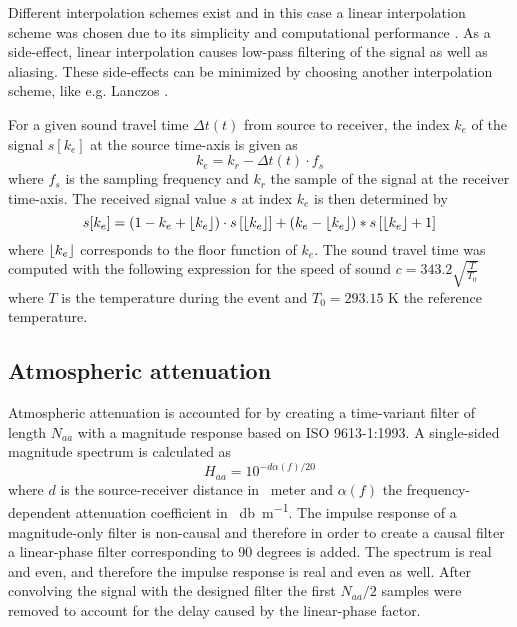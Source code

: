 \documentclass[10pt,twocolumn]{article}
\DeclarePairedDelimiter\floor{\lfloor}{\rfloor}
\begin{document}
Different interpolation schemes exist and in this case a linear interpolation
scheme was chosen due to its simplicity and computational performance \cite{Heutschi2014}.
As a side-effect, linear interpolation causes low-pass filtering of the signal as
well as aliasing. These side-effects can be minimized by choosing another
interpolation scheme, like e.g. Lanczos \cite{Rietdijk2015, Pieren2015}.


For a given sound travel time $\Delta t(t)$ from source to receiver, the index
$k_{e}$ of the signal $s[k_e]$ at the source time-axis is given as
\begin{equation}
 k_{e} = k_r - \Delta t (t) \cdot f_s
\end{equation}
where $f_s$ is the sampling frequency and $k_r$ the sample of the signal at the receiver time-axis. The received signal value $s$ at index $k_e$ is then determined by
\begin{equation}
 s[k_e] = \left( 1 - k_e +  \floor{k_e} \right) \cdot s \left[ \floor{k_e} \right] + \left( k_e - \floor{k_e} \right) * s \left[ \floor{k_e} + 1 \right]
\end{equation}
where $\floor{k_e}$ corresponds to the floor function of $k_e$.
The sound travel time was computed with the following expression for the speed of sound $c = 343.2 \sqrt{ \frac{T}{T_0} }$
where $T$ is the temperature during the event and $T_0 = 293.15$ K the reference temperature.


\subsection{Atmospheric attenuation}
Atmospheric attenuation is accounted for by creating a time-variant filter of length $N_{aa}$
with a magnitude response based on ISO 9613-1:1993\cite{ISO9613-1}. A single-sided magnitude spectrum is calculated as
\begin{equation}
 H_{aa} = 10^{- d \alpha(f) / 20}
\end{equation}
where $d$ is the source-receiver distance in \SI{}{meter} and $\alpha(f)$ the
frequency-dependent attenuation coefficient in \SI{}{\decibel\per\meter}.
The impulse response of a magnitude-only filter is non-causal and therefore in
order to create a causal filter a linear-phase filter corresponding to 90
degrees is added. The spectrum is real and even, and therefore the impulse
response is real and even as well. After convolving the signal with the designed
filter the first $N_{aa}/2$ samples were removed to account for the delay caused
by the linear-phase factor.
\end{document}
